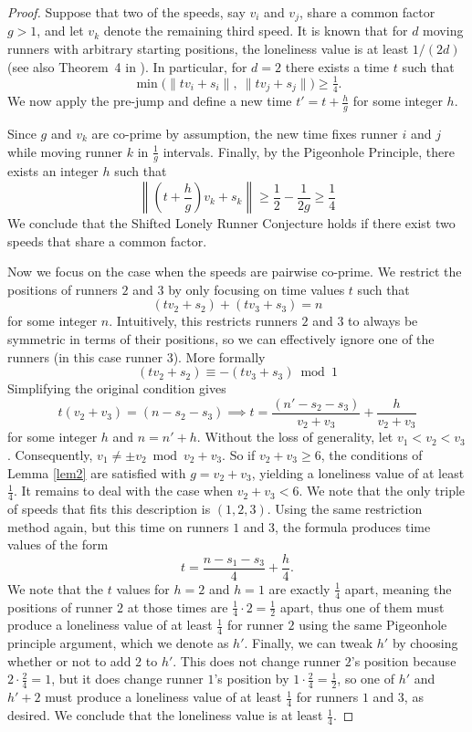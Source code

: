 \documentclass[11pt]{amsart}
\newcommand{\Norm}[1]{\left\lVert #1 \right\rVert}
\begin{document}
\begin{proof}
    Suppose that two of the speeds, say $v_i$ and $v_j$, share a common factor $g>1$, and let $v_k$ denote the remaining third speed. It is known that for $d$ moving runners with arbitrary starting positions, the loneliness value is at least $1/(2d)$ \cite{SCHOENBERG1976263} (see also Theorem~4 in \cite{BeckHostenSchymura2019}). In particular, for $d=2$ there exists a time $t$ such that
    \[
    \min\bigl(\|tv_i+s_i\|,\ \|tv_j+s_j\|\bigr)\ge \tfrac14.
    \]
    We now apply the pre-jump and define a new time $t' = t + \frac{h}{g}$ for some integer $h$.

    Since $g$ and $v_k$ are co-prime by assumption, the new time fixes runner $i$ and $j$ while moving runner $k$ in $\frac{1}{g}$ intervals. Finally, by the Pigeonhole Principle, there exists an integer $h$ such that
    $$\Norm{\left(t + \frac{h}{g}\right)v_k + s_k} \geq \frac{1}{2} - \frac{1}{2g} \geq \frac{1}{4}$$
    We conclude that the Shifted Lonely Runner Conjecture holds if there exist two speeds that share a common factor.
    
    Now we focus on the case when the speeds are pairwise co-prime. We restrict the positions of runners $2$ and $3$ by only focusing on time values $t$ such that
    $$(tv_2 + s_2) + (tv_3 + s_3) = n$$
    for some integer $n$. Intuitively, this restricts runners $2$ and $3$ to always be symmetric in terms of their positions, so we can effectively ignore one of the runners (in this case runner $3$). More formally
    $$(tv_2 + s_2) \equiv -(tv_3 + s_3) \bmod 1$$
    Simplifying the original condition gives
    $$t(v_2 + v_3) = (n - s_2 - s_3) \implies t = \frac{(n' - s_2 - s_3)}{v_2 + v_3} + \frac{h}{v_2 + v_3}$$
    for some integer $h$ and $n = n' + h$. Without the loss of generality, let $v_1 < v_2 < v_3$. Consequently, $v_1 \neq \pm v_2 \bmod {v_2 + v_3}$. So if $v_2 + v_3 \geq 6$, the conditions of Lemma \ref{lem2} are satisfied with $g = v_2 + v_3$, yielding a loneliness value of at least $\frac{1}{4}$. It remains to deal with the case when $v_2 + v_3 < 6$. We note that the only triple of speeds that fits this description is $(1,2,3)$. Using the same restriction method again, but this time on runners $1$ and $3$, the formula produces time values of the form
    $$t = \frac{n - s_1 - s_3}{4} + \frac{h}{4}.$$
    We note that the $t$ values for $h = 2$ and $h = 1$ are exactly $\frac{1}{4}$ apart, meaning the positions of runner $2$ at those times are $\frac{1}{4} \cdot 2 = \frac{1}{2}$ apart, thus one of them must produce a loneliness value of at least $\frac{1}{4}$ for runner $2$ using the same Pigeonhole principle argument, which we denote as $h'$. Finally, we can tweak $h'$ by choosing whether or not to add $2$ to $h'$. This does not change runner $2$'s position because $2 \cdot \frac{2}{4} = 1$, but it does change runner $1$'s position by $1 \cdot \frac{2}{4} = \frac{1}{2}$, so one of $h'$ and $h' + 2$ must produce a loneliness value of at least $\frac{1}{4}$ for runners $1$ and $3$, as desired. We conclude that the loneliness value is at least $\frac{1}{4}$.
\end{proof}
\end{document}
